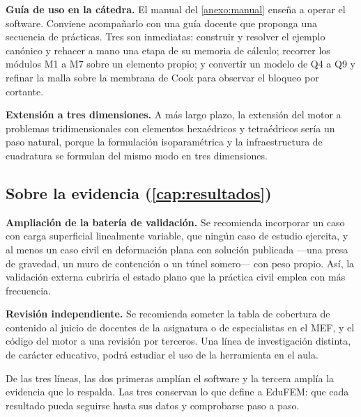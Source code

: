 \textbf{Guía de uso en la cátedra.} El manual del \autoref{anexo:manual} enseña a operar el software. Conviene acompañarlo con una guía docente que proponga una secuencia de prácticas. Tres son inmediatas: construir y resolver el ejemplo canónico y rehacer a mano una etapa de su memoria de cálculo; recorrer los módulos M1 a M7 sobre un elemento propio; y convertir un modelo de Q4 a Q9 y refinar la malla sobre la membrana de Cook para observar el bloqueo por cortante.

\textbf{Extensión a tres dimensiones.} A más largo plazo, la extensión del motor a problemas tridimensionales con elementos hexaédricos y tetraédricos sería un paso natural, porque la formulación isoparamétrica y la infraestructura de cuadratura se formulan del mismo modo en tres dimensiones.

\subsection*{Sobre la evidencia (\autoref{cap:resultados})}

\textbf{Ampliación de la batería de validación.} Se recomienda incorporar un caso con carga superficial linealmente variable, que ningún caso de estudio ejercita, y al menos un caso civil en deformación plana con solución publicada —una presa de gravedad, un muro de contención o un túnel somero— con peso propio. Así, la validación externa cubriría el estado plano que la práctica civil emplea con más frecuencia.

\textbf{Revisión independiente.} Se recomienda someter la tabla de cobertura de contenido al juicio de docentes de la asignatura o de especialistas en el MEF, y el código del motor a una revisión por terceros. Una línea de investigación distinta, de carácter educativo, podrá estudiar el uso de la herramienta en el aula.

De las tres líneas, las dos primeras amplían el software y la tercera amplía la evidencia que lo respalda. Las tres conservan lo que define a EduFEM: que cada resultado pueda seguirse hasta sus datos y comprobarse paso a paso.
